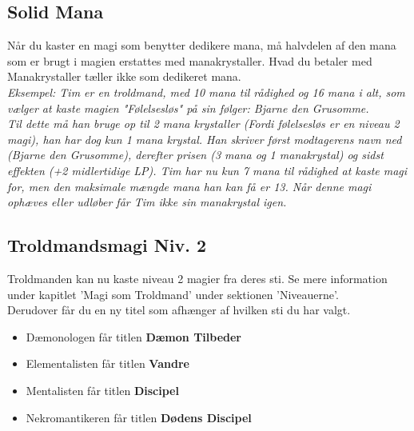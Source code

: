 \subsection{Solid Mana}
Når du kaster en magi som benytter dedikere mana, må halvdelen af den mana som er brugt i magien erstattes med manakrystaller. Hvad du betaler med Manakrystaller tæller ikke som dedikeret mana.\\
\textit{Eksempel: Tim er en troldmand, med 10 mana til rådighed og 16 mana i alt, som vælger at kaste magien "Følelsesløs" på sin følger: Bjarne den Grusomme.\\ 
Til dette må han bruge op til 2 mana krystaller (Fordi følelsesløs er en niveau 2 magi), han har dog kun 1 mana krystal. Han skriver først modtagerens navn ned (Bjarne den Grusomme), derefter prisen (3 mana og 1 manakrystal) og sidst effekten (+2 midlertidige LP).
Tim har nu kun 7 mana til rådighed at kaste magi for, men den maksimale mængde mana han kan få er 13. Når denne magi ophæves eller udløber får Tim \emph{ikke} sin manakrystal igen.}

\subsection{Troldmandsmagi Niv. 2}
Troldmanden kan nu kaste niveau 2 magier fra deres sti. Se mere information under kapitlet 'Magi som Troldmand' under sektionen 'Niveauerne'. \\
Derudover får du en ny titel som afhænger af hvilken sti du har valgt.\\
\begin{itemize}
    \item Dæmonologen får titlen \textbf{Dæmon Tilbeder}
    \item Elementalisten får titlen \textbf{Vandre}
    \item Mentalisten får titlen \textbf{Discipel}
    \item Nekromantikeren får titlen \textbf{Dødens Discipel}
\end{itemize}
